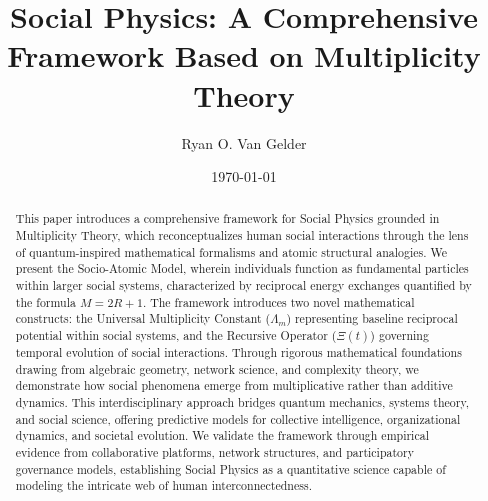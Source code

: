 \documentclass[11pt,a4paper]{article}
\title{\textbf{Social Physics: A Comprehensive Framework Based on Multiplicity Theory}}
\author[1]{Ryan O. Van Gelder}
\affil[1]{Multiplicity Theorist, Crown City, Ohio, United States}
\date{\today}
\begin{document}
\maketitle

\begin{center}
\end{center}



\begin{abstract}
This paper introduces a comprehensive framework for Social Physics grounded in Multiplicity Theory, which reconceptualizes human social interactions through the lens of quantum-inspired mathematical formalisms and atomic structural analogies. We present the Socio-Atomic Model, wherein individuals function as fundamental particles within larger social systems, characterized by reciprocal energy exchanges quantified by the formula $M = 2R + 1$. The framework introduces two novel mathematical constructs: the Universal Multiplicity Constant ($\Lambda_m$) representing baseline reciprocal potential within social systems, and the Recursive Operator ($\Xi(t)$) governing temporal evolution of social interactions. Through rigorous mathematical foundations drawing from algebraic geometry, network science, and complexity theory, we demonstrate how social phenomena emerge from multiplicative rather than additive dynamics. This interdisciplinary approach bridges quantum mechanics, systems theory, and social science, offering predictive models for collective intelligence, organizational dynamics, and societal evolution. We validate the framework through empirical evidence from collaborative platforms, network structures, and participatory governance models, establishing Social Physics as a quantitative science capable of modeling the intricate web of human interconnectedness.
\end{abstract}
\end{document}
